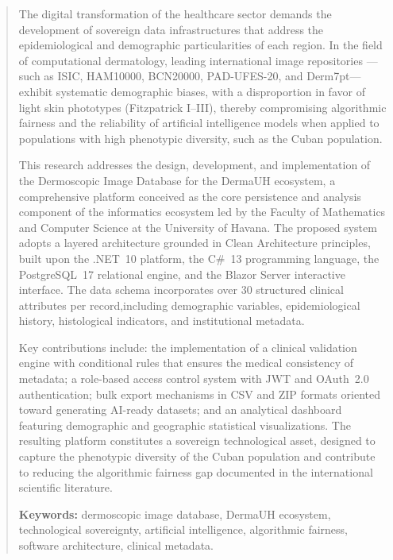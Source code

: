 \begin{abstract}
The digital transformation of the healthcare sector demands the development of sovereign data 
infrastructures that address the epidemiological and demographic particularities of each region. 
In the field of computational dermatology, leading international image repositories ---such as ISIC, 
HAM10000, BCN20000, PAD-UFES-20, and Derm7pt--- exhibit systematic demographic biases, with a 
disproportion in favor of light skin phototypes (Fitzpatrick I--III), thereby compromising algorithmic 
fairness and the reliability of artificial intelligence models when applied to populations with high 
phenotypic diversity, such as the Cuban population.

This research addresses the design, development, and implementation of the Dermoscopic Image Database for 
the DermaUH ecosystem, a comprehensive platform conceived as the core persistence and analysis component 
of the informatics ecosystem led by the Faculty of Mathematics and Computer Science at the University of 
Havana. The proposed system adopts a layered architecture grounded in Clean Architecture principles, built 
upon the .NET~10 platform, the C\#~13 programming language, the PostgreSQL~17 relational engine, and the 
Blazor Server interactive interface. The data schema incorporates over 30 structured clinical attributes 
per record,including demographic variables, epidemiological history, histological indicators, and 
institutional metadata.

Key contributions include: the implementation of a clinical validation engine with conditional rules that 
ensures the medical consistency of metadata; a role-based access control system with JWT and OAuth~2.0 
authentication; bulk export mechanisms in CSV and ZIP formats oriented toward generating AI-ready datasets; 
and an analytical dashboard featuring demographic and geographic statistical visualizations. The resulting 
platform constitutes a sovereign technological asset, designed to capture the phenotypic diversity of the 
Cuban population and contribute to reducing the algorithmic fairness gap documented in the international 
scientific literature.

\textbf{Keywords:} dermoscopic image database, DermaUH ecosystem, technological sovereignty, artificial 
intelligence, algorithmic fairness, software architecture, clinical metadata.
\end{abstract}